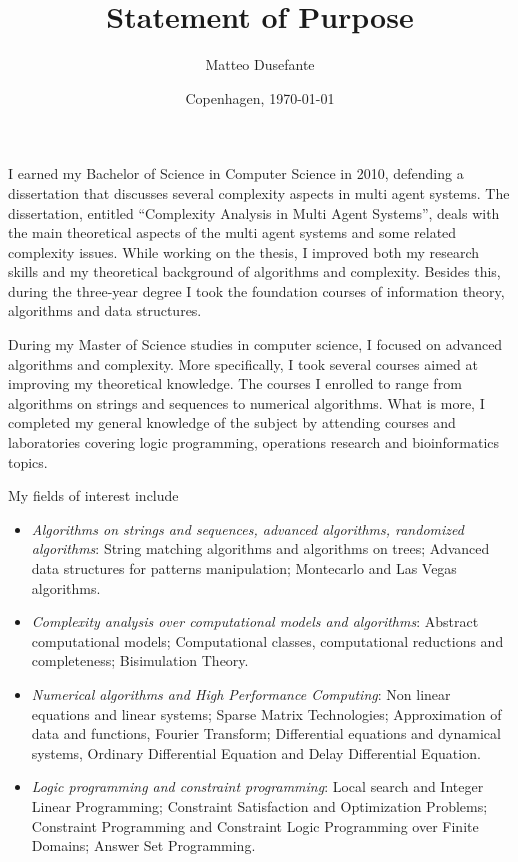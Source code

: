 \documentclass{article}
\title{Statement of Purpose}
\author{Matteo Dusefante}
\date{Copenhagen, \today}
\begin{document}
\maketitle

I earned my Bachelor of Science in Computer Science in 2010, defending a dissertation that discusses several complexity aspects in multi agent systems. The dissertation, entitled ``Complexity Analysis in Multi Agent Systems'', deals with the main theoretical aspects of the multi agent systems and some related complexity issues. While working on the thesis, I improved both my research skills and my theoretical background of algorithms and complexity. Besides this, during the three-year degree I took the foundation courses of information theory, algorithms and data structures.

\bigskip

During my Master of Science studies in computer science, I focused on advanced algorithms and complexity. More specifically, I took several courses aimed at improving my theoretical knowledge. The courses I enrolled to range from algorithms on strings and sequences to numerical algorithms. What is more, I completed my general knowledge of the subject by attending courses and laboratories covering logic programming, operations research and bioinformatics topics.

My fields of interest include

\begin{itemize}
\item \emph{Algorithms on strings and sequences, advanced algorithms, randomized algorithms}: String matching algorithms and algorithms on trees; Advanced data structures for patterns manipulation; Montecarlo and Las Vegas algorithms.
\item \emph{Complexity analysis over computational models and algorithms}: Abstract computational models; Computational classes, computational reductions and completeness; Bisimulation Theory.
\item \emph{Numerical algorithms and High Performance Computing}: Non linear equations and linear systems; Sparse Matrix Technologies; Approximation of data and functions, Fourier Transform; Differential equations and dynamical systems, Ordinary Differential Equation and Delay Differential Equation.
\item \emph{Logic programming and constraint programming}: Local search and Integer Linear Programming; Constraint Satisfaction and Optimization Problems; Constraint Programming and Constraint Logic Programming over Finite Domains; Answer Set Programming.
\end{itemize}
\end{document}
